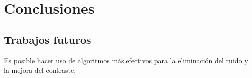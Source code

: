 \chapter{Conclusiones}

\section{Trabajos futuros}

Es posible hacer uso de algoritmos más efectivos para la eliminación del ruido y
la mejora del contraste.

